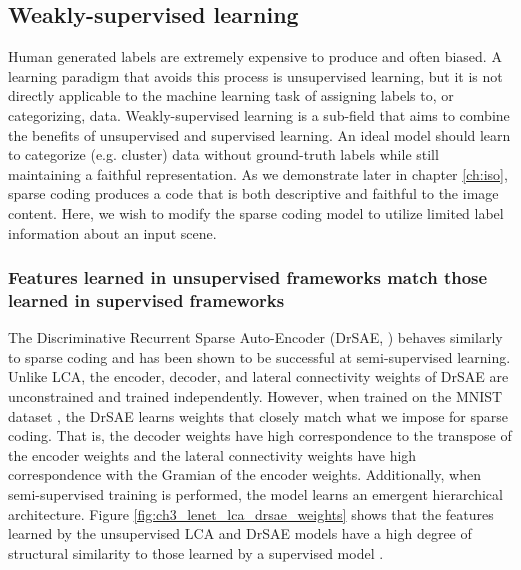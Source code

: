 \subsection{Weakly-supervised learning}

Human generated labels are extremely expensive to produce and often biased. A learning paradigm that avoids this process is unsupervised learning, but it is not directly applicable to the machine learning task of assigning labels to, or categorizing, data. Weakly-supervised learning is a sub-field that aims to combine the benefits of unsupervised and supervised learning. An ideal model should learn to categorize (e.g. cluster) data without ground-truth labels while still maintaining a faithful representation. As we demonstrate later in chapter \ref{ch:iso}, sparse coding produces a code that is both descriptive and faithful to the image content. Here, we wish to modify the sparse coding model to utilize limited label information about an input scene.

\subsubsection{Features learned in unsupervised frameworks match those learned in supervised frameworks}
The Discriminative Recurrent Sparse Auto-Encoder (DrSAE, \cite{rolfe2013discriminative}) behaves similarly to sparse coding and has been shown to be successful at semi-supervised learning. Unlike LCA, the encoder, decoder, and lateral connectivity weights of DrSAE are unconstrained and trained independently. However, when trained on the MNIST dataset \parencite{lecun1998mnist}, the DrSAE learns weights that closely match what we impose for sparse coding. That is, the decoder weights have high correspondence to the transpose of the encoder weights and the lateral connectivity weights have high correspondence with the Gramian of the encoder weights. Additionally, when semi-supervised training is performed, the model learns an emergent hierarchical architecture. Figure \ref{fig:ch3_lenet_lca_drsae_weights} shows that the features learned by the unsupervised LCA and DrSAE models have a high degree of structural similarity to those learned by a supervised model \parencite{lecun1998gradient}.

